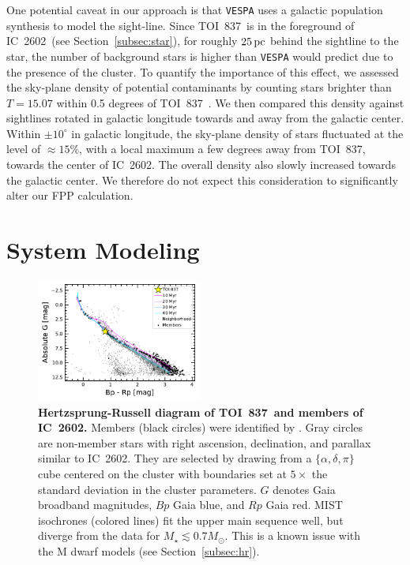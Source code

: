 \documentclass[12pt,twocolumn,tighten]{aastex63}
\newcommand{\tn}{TOI~837} %
\newcommand{\cn}{IC~2602} %
\begin{document}
One potential caveat in our approach is that \texttt{VESPA} uses a
galactic population synthesis to model the sight-line. Since \tn\ is
in the foreground of \cn\ (see Section~\ref{subsec:star}), for roughly
$25\,{\rm pc}$ behind the sightline to the star, the number of
background stars is higher than \texttt{VESPA} would predict due to
the presence of the cluster.  To quantify the importance of this
effect, we assessed the sky-plane density of potential contaminants by
counting stars brighter than $T=15.07$ within 0.5 degrees of \tn\
\citep{stassun_TIC8_2019}. We then compared this density against
sightlines rotated in galactic longitude towards and away from the
galactic center. Within $\pm10^\circ$ in galactic longitude, the
sky-plane density of stars fluctuated at the level of $\approx 15\%$,
with a local maximum a few degrees away from \tn, towards the center
of \cn.  The overall density also slowly increased towards the
galactic center.  We therefore do not expect this consideration to
significantly alter our FPP calculation.


\section{System Modeling}
\label{sec:system}

\begin{figure}[!t]
	\begin{center}
		\leavevmode
		\includegraphics[width=0.48\textwidth]{f7.pdf}
	\end{center}
	\vspace{-0.7cm}
	\caption{ 
  {\bf Hertzsprung-Russell diagram of \tn\ and members of \cn.}
  Members (black circles) were identified by
  \citet{cantatgaudin_gaia_2018}.  Gray circles are non-member stars
  with right ascension, declination, and parallax similar to \cn.
  They are selected by drawing from a $\{\alpha, \delta, \pi\}$ cube
  centered on the cluster with boundaries set at $5\times$ the
  standard deviation in the cluster parameters.  $G$ denotes Gaia
  broadband magnitudes, $Bp$ Gaia blue, and $Rp$ Gaia red.  MIST
  isochrones (colored lines) fit the upper main sequence well, but
  diverge from the data for $M_\star \lesssim 0.7 M_\odot$. This is a
  known issue with the M dwarf models (see Section~\ref{subsec:hr}).
  \label{fig:hr}
	}
\end{figure}
\end{document}
